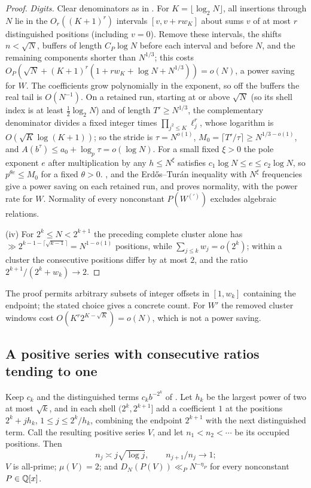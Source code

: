 \documentclass[11pt]{article}
\begin{document}
\begin{proof}
\emph{Digits.} Clear denominators as in . For $K=\lfloor\log_2N\rfloor$, all insertions through $N$ lie in the
$O_r((K+1)^r)$ intervals $[v,v+rw_K]$ about sums $v$ of at most $r$ distinguished positions (including $v=0$). Remove these
intervals, the shifts $n<\sqrt N$, buffers of length $C_P\log N$ before each interval and before $N$, and the remaining components
shorter than $N^{1/3}$; this costs $O_P(\sqrt N+(K+1)^r(1+rw_K+\log N+N^{1/3}))=o(N)$, a power saving for $W$. The coefficients grow
polynomially in the exponent, so off the buffers the real tail is $O(N^{-1})$. On a retained run, starting at or above $\sqrt N$
(so its shell index is at least $\frac12\log_2N$) and of length $T'\ge N^{1/3}$, the complementary denominator divides a fixed integer
times $\prod_{j^2\le K}\ell_j^r$, whose logarithm is $O(\sqrt K\log(K+1))$; so the stride is $\tau=N^{o(1)}$, $M_0=\lceil T'/\tau\rceil\ge N^{1/3-o(1)}$,
and $A(b^\tau)\le a_0+\log_p\tau=o(\log N)$. For a small fixed $\xi>0$ the pole exponent $e$ after multiplication by any $h\le N^\xi$
satisfies $c_1\log N\le e\le c_2\log N$, so $p^{\theta e}\le M_0$ for a fixed $\theta>0$. ,  and the
Erd\H{o}s--Tur\'an inequality with $N^\xi$ frequencies give a power saving on each retained run, and  proves
normality, with the power rate for $W$. Normality of every nonconstant $P(W^{(\prime)})$ excludes algebraic relations.

(iv) For $2^k\le N<2^{k+1}$ the preceding complete cluster alone has $\gg2^{k-1-\lceil\sqrt{k-1}\rceil}=N^{1-o(1)}$ positions, while
$\sum_{j\le k}w_j=o(2^k)$; within a cluster the consecutive positions differ by at most $2$, and the ratio $2^{k+1}/(2^k+w_k)\to2$.
\end{proof}

The proof permits arbitrary subsets of integer offsets in $[1,w_k]$ containing the endpoint; the stated choice gives a concrete
count. For $W'$ the removed cluster windows cost $O(K^r2^{K-\sqrt K})=o(N)$, which is not a power saving.

\subsection{A positive series with consecutive ratios tending to one}

\begin{theorem}\label{thm:dense}
Keep $c_k$ and the distinguished terms $c_kb^{-2^k}$ of . Let $h_k$ be the largest power of two at most $\sqrt k$,
and in each shell $(2^k,2^{k+1}]$ add a coefficient $1$ at the positions $2^k+jh_k$, $1\le j\le2^k/h_k$, combining the endpoint $2^{k+1}$ with
the next distinguished term. Call the resulting positive series $V$, and let $n_1<n_2<\cdots$ be its occupied positions. Then
\[
n_j\asymp j\sqrt{\log j},\qquad n_{j+1}/n_j\to1;
\]
$V$ is all-prime; $\mu(V)=2$; and $D_N(P(V))\ll_PN^{-\eta_P}$ for every nonconstant $P\in\mathbb Q[x]$.
\end{theorem}
\end{document}

